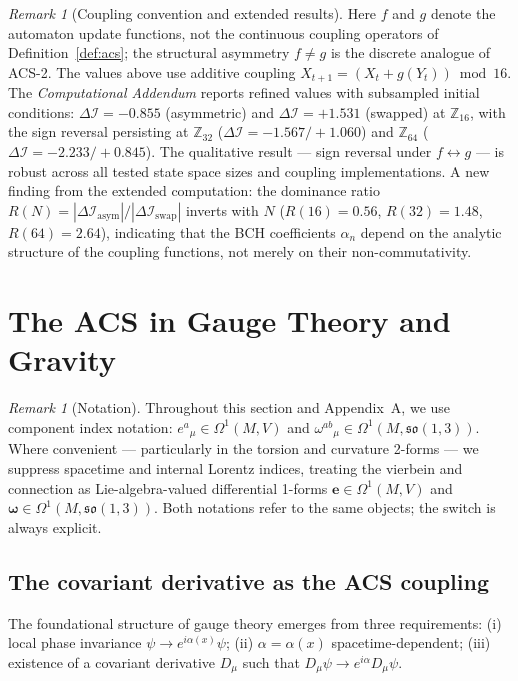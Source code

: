 \documentclass[11pt,a4paper]{article}
\theoremstyle{plain}
\theoremstyle{definition}
\theoremstyle{remark}
\newtheorem{remark}[theorem]{Remark}
\newcommand{\DI}{\Delta\mathcal{I}}
\begin{document}
\begin{remark}[Coupling convention and extended results]
Here $f$ and $g$ denote the automaton update functions, not the continuous
coupling operators of Definition~\ref{def:acs}; the structural asymmetry
$f \neq g$ is the discrete analogue of ACS-2.
The values above use additive coupling $X_{t+1} = (X_t + g(Y_t)) \bmod 16$.
The \textit{Computational Addendum} reports refined values with
subsampled initial conditions: $\DI = -0.855$ (asymmetric) and
$\DI = +1.531$ (swapped) at $\mathbb{Z}_{16}$, with the sign reversal
persisting at $\mathbb{Z}_{32}$ ($\DI = -1.567 / +1.060$) and
$\mathbb{Z}_{64}$ ($\DI = -2.233 / +0.845$).  The qualitative result
--- sign reversal under $f \leftrightarrow g$ --- is robust across all
tested state space sizes and coupling implementations.  A new finding
from the extended computation: the dominance ratio
$R(N) = |\DI_{\mathrm{asym}}|/|\DI_{\mathrm{swap}}|$ inverts with $N$
($R(16) = 0.56$, $R(32) = 1.48$, $R(64) = 2.64$), indicating that the
BCH coefficients $\alpha_n$ depend on the analytic structure of the
coupling functions, not merely on their non-commutativity.
\end{remark}
\section{The ACS in Gauge Theory and Gravity}
\label{sec:gauge}

\begin{remark}[Notation]
Throughout this section and Appendix~A, we use component index notation: $e^a{}_\mu \in \Omega^1(M, V)$ and $\omega^{ab}{}_\mu \in \Omega^1(M, \mathfrak{so}(1,3))$. Where convenient --- particularly in the torsion and curvature 2-forms --- we suppress spacetime and internal Lorentz indices, treating the vierbein and connection as Lie-algebra-valued differential 1-forms $\mathbf{e} \in \Omega^1(M, V)$ and $\boldsymbol{\omega} \in \Omega^1(M, \mathfrak{so}(1,3))$. Both notations refer to the same objects; the switch is always explicit.
\end{remark}

\subsection{The covariant derivative as the ACS coupling}

The foundational structure of gauge theory emerges from three requirements:
(i) local phase invariance $\psi \to e^{i\alpha(x)}\psi$;
(ii) $\alpha = \alpha(x)$ spacetime-dependent;
(iii) existence of a covariant derivative $D_\mu$ such that 
$D_\mu\psi \to e^{i\alpha} D_\mu\psi$.
\end{document}
